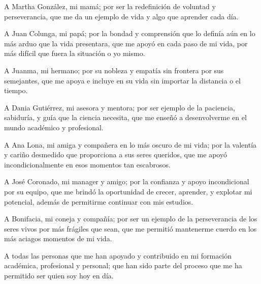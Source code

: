 %

A Martha González, mi mamá; por ser la redefinición de voluntad y perseverancia, que me da un ejemplo de vida y algo que aprender cada día.

A Juan Colunga, mi papá; por la bondad y comprensión que lo definía aún en lo más arduo que la vida presentara, que me apoyó en cada paso de mi vida, por más difícil que fuera la situación o yo mismo.

A Juanma, mi hermano; por su nobleza y empatía sin frontera por sus semejantes, que me apoya e incluye en su vida sin importar la distancia o el tiempo.

A Dania Gutiérrez, mi asesora y mentora; por ser ejemplo de la paciencia, sabiduría, y guía que la ciencia necesita, que me enseñó a desenvolverme en el mundo académico y profesional.

A Ana Lona, mi amiga y compañera en lo más oscuro de mi vida; por la valentía y cariño desmedido que proporciona a sus seres queridos, que me apoyó incondicionalmente en esos momentos tan escabrosos.

A José Coronado, mi manager y amigo; por la confianza y apoyo incondicional por su equipo, que me brindó la oportunidad de crecer, aprender, y explotar mi potencial, además de permitirme continuar con mis estudios.

A Bonifacia, mi coneja y compañía; por ser un ejemplo de la perseverancia de los seres vivos por más frágiles que sean, que me permitió mantenerme cuerdo en los más aciagos momentos de mi vida.

A todas las personas que me han apoyado y contribuido en mi formación académica, profesional y personal; que han sido parte del proceso que me ha permitido ser quien soy hoy en día.